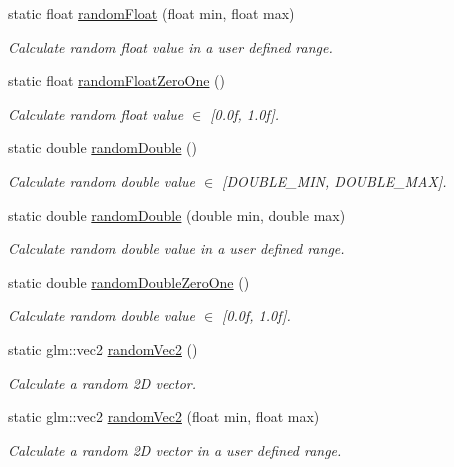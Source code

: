 \begin{DoxyCompactItemize}
static float \mbox{\hyperlink{classr3_1_1_random_a37e0fe288d26258964bb724c7335446c}{random\+Float}} (float min, float max)
\begin{DoxyCompactList}\small\item\em Calculate random float value in a user defined range. \end{DoxyCompactList}\item 
static float \mbox{\hyperlink{classr3_1_1_random_af56217d8a7b64eec4fec0f4047e49075}{random\+Float\+Zero\+One}} ()
\begin{DoxyCompactList}\small\item\em Calculate random float value $\in$ \mbox{[}0.\+0f, 1.\+0f\mbox{]}. \end{DoxyCompactList}\item 
static double \mbox{\hyperlink{classr3_1_1_random_a69d200d316daad8cfa6efdd1196a2c38}{random\+Double}} ()
\begin{DoxyCompactList}\small\item\em Calculate random double value $\in$ \mbox{[}D\+O\+U\+B\+L\+E\+\_\+\+M\+IN, D\+O\+U\+B\+L\+E\+\_\+\+M\+AX\mbox{]}. \end{DoxyCompactList}\item 
static double \mbox{\hyperlink{classr3_1_1_random_a059b209f1eb1f46a8a9101ada359b028}{random\+Double}} (double min, double max)
\begin{DoxyCompactList}\small\item\em Calculate random double value in a user defined range. \end{DoxyCompactList}\item 
static double \mbox{\hyperlink{classr3_1_1_random_a04e1db517c98c2ea6b75b7dfe8466ded}{random\+Double\+Zero\+One}} ()
\begin{DoxyCompactList}\small\item\em Calculate random double value $\in$ \mbox{[}0.\+0f, 1.\+0f\mbox{]}. \end{DoxyCompactList}\item 
static glm\+::vec2 \mbox{\hyperlink{classr3_1_1_random_af52bb4270520c41c040d037ba88a8641}{random\+Vec2}} ()
\begin{DoxyCompactList}\small\item\em Calculate a random 2D vector. \end{DoxyCompactList}\item 
static glm\+::vec2 \mbox{\hyperlink{classr3_1_1_random_a3b1929d7308488b7016adaa24e93b2bb}{random\+Vec2}} (float min, float max)
\begin{DoxyCompactList}\small\item\em Calculate a random 2D vector in a user defined range. \end{DoxyCompactList}\item 

\end{DoxyCompactItemize}
